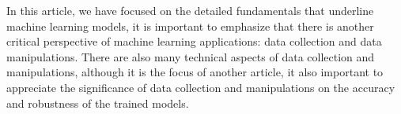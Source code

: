 
\par
In this article, we have focused on the detailed fundamentals that underline machine learning models, it is important to emphasize that there is another critical perspective of machine learning applications: data collection and data manipulations. There are also many technical aspects of data collection and manipulations, although it is the focus of another article, it also important to appreciate the significance of data collection and manipulations on the accuracy and robustness of the trained models.
\par 
